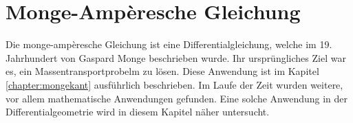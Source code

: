 %
%
%
%
\chapter{Monge-Ampèresche Gleichung\label{chapter:mongeampere}}
\begin{refsection}

Die monge-ampèresche Gleichung ist eine Differentialgleichung, welche
im 19. Jahrhundert von Gaspard Monge beschrieben wurde. 
Ihr ursprüngliches Ziel war es, ein Massentransportprobelm zu lösen. 
Diese Anwendung ist im Kapitel \ref{chapter:mongekant} ausführlich beschrieben.
Im Laufe der Zeit wurden weitere, vor allem mathematische Anwendungen
gefunden.
Eine solche Anwendung in der Differentialgeometrie wird in diesem Kapitel näher 
untersucht.




% 

\printbibliography[heading=subbibliography]
\end{refsection}
